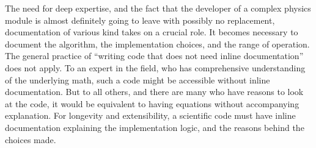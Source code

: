 The need for deep expertise, and the fact that the developer of a
complex physics module is almost definitely going to leave with
possibly no replacement, documentation of various kind takes on a
crucial role. It becomes necessary to document the algorithm, the
implementation choices, and the range of operation. The general
practice of ``writing code that does not need inline documentation''
does not apply. To an expert in the field, who has comprehensive
understanding of the underlying math, such a code might be accessible
without inline documentation. But to all others, and there are many
who have reasons to look at the code, it would be equivalent to having
equations without accompanying explanation. For longevity and
extensibility, a scientific code must have inline documentation
explaining the implementation logic, and the reasons behind the
choices made.   

